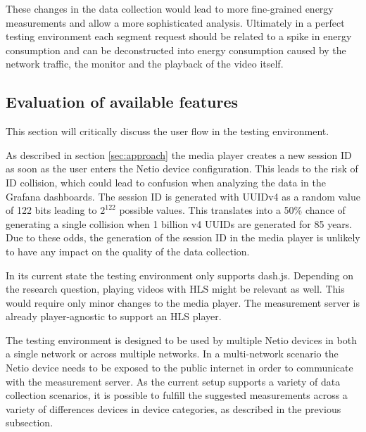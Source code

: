 These changes in the data collection would lead to more fine-grained energy measurements and allow a more sophisticated analysis. Ultimately in a perfect testing environment each segment request should be related to a spike in energy consumption and can be deconstructed into energy consumption caused by the network traffic, the monitor and the playback of the video itself. 

\subsection{Evaluation of available features}
This section will critically discuss the user flow in the testing environment. 

As described in section \ref{sec:approach} the media player creates a new session ID as soon as the user enters the Netio device configuration. This leads to the risk of ID collision, which could lead to confusion when analyzing the data in the Grafana dashboards. The session ID is generated with UUIDv4 as a random value of 122 bits leading to $2^{122}$ possible values. This translates into a 50\% chance of generating a single collision when 1 billion v4 UUIDs are generated for 85 years. Due to these odds, the generation of the session ID in the media player is unlikely to have any impact on the quality of the data collection. 

In its current state the testing environment only supports dash.js. Depending on the research question, playing videos with HLS might be relevant as well. This would require only minor changes to the media player. The measurement server is  already player-agnostic to support an HLS player. 

The testing environment is designed to be used by multiple Netio devices in both a single network or across multiple networks. In a multi-network scenario the Netio device needs to be exposed to the public internet in order to communicate with the measurement server. As the current setup supports a variety of data collection scenarios, it is possible to fulfill the suggested measurements across a variety of differences devices in device categories, as described in the previous subsection. 

